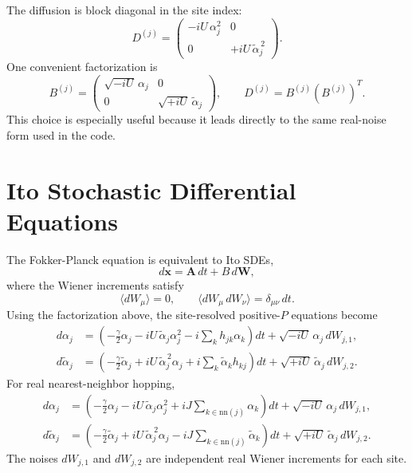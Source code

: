 \documentclass[12pt]{article}
\begin{document}
The diffusion is block diagonal in the site index:
\[
D^{(j)}
=
\begin{pmatrix}
-iU\,\alpha_j^2 & 0 \\
0 & +iU\,\widetilde{\alpha}_j^{\,2}
\end{pmatrix}.
\]
One convenient factorization is
\[
B^{(j)}
=
\begin{pmatrix}
\sqrt{-iU}\,\alpha_j & 0 \\
0 & \sqrt{+iU}\,\widetilde{\alpha}_j
\end{pmatrix},
\qquad
D^{(j)} = B^{(j)} \left(B^{(j)}\right)^T.
\]
This choice is especially useful because it leads directly to the same real-noise form used in the code.

\section*{Ito Stochastic Differential Equations}
The Fokker-Planck equation is equivalent to Ito SDEs,
\[
d\bm{x} = \bm{A}\,dt + B\,d\bm{W},
\]
where the Wiener increments satisfy
\[
\langle dW_\mu \rangle = 0,
\qquad
\langle dW_\mu\,dW_\nu \rangle = \delta_{\mu\nu}\,dt.
\]
Using the factorization above, the site-resolved positive-$P$ equations become
\begin{align}
d\alpha_j
&=
\left(
-\frac{\gamma}{2}\alpha_j
-iU\,\widetilde{\alpha}_j\alpha_j^2
-i\sum_k h_{jk}\alpha_k
\right)dt
+ \sqrt{-iU}\,\alpha_j\,dW_{j,1}, \\
d\widetilde{\alpha}_j
&=
\left(
-\frac{\gamma}{2}\widetilde{\alpha}_j
+iU\,\widetilde{\alpha}_j^{\,2}\alpha_j
+i\sum_k \widetilde{\alpha}_k h_{kj}
\right)dt
+ \sqrt{+iU}\,\widetilde{\alpha}_j\,dW_{j,2}.
\end{align}
For real nearest-neighbor hopping,
\begin{align}
d\alpha_j
&=
\left(
-\frac{\gamma}{2}\alpha_j
-iU\,\widetilde{\alpha}_j\alpha_j^2
+iJ\sum_{k\in \mathrm{nn}(j)} \alpha_k
\right)dt
+ \sqrt{-iU}\,\alpha_j\,dW_{j,1}, \\
d\widetilde{\alpha}_j
&=
\left(
-\frac{\gamma}{2}\widetilde{\alpha}_j
+iU\,\widetilde{\alpha}_j^{\,2}\alpha_j
-iJ\sum_{k\in \mathrm{nn}(j)} \widetilde{\alpha}_k
\right)dt
+ \sqrt{+iU}\,\widetilde{\alpha}_j\,dW_{j,2}.
\end{align}
The noises $dW_{j,1}$ and $dW_{j,2}$ are independent real Wiener increments for each site.
\end{document}
